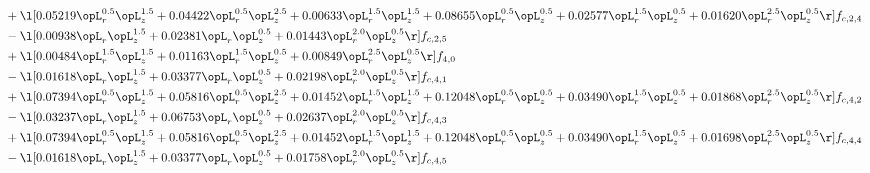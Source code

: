 \begin{alignat}{2}
& + \l[  0.05219 \opL_r^{0.5} \opL_z^{1.5} +  0.04422 \opL_r^{0.5} \opL_z^{2.5} +  0.00633 \opL_r^{1.5} \opL_z^{1.5} +  0.08655 \opL_r^{0.5} \opL_z^{0.5} +  0.02577 \opL_r^{1.5} \opL_z^{0.5} +  0.01620 \opL_r^{2.5} \opL_z^{0.5}  \r] f_{c,2,4} \nonumber \\ 
& - \l[  0.00938 \opL_r \opL_z^{1.5} +  0.02381 \opL_r \opL_z^{0.5} +  0.01443 \opL_r^{2.0} \opL_z^{0.5}  \r] f_{c,2,5} \nonumber \\ 
& + \l[  0.00484 \opL_r^{1.5} \opL_z^{1.5} +  0.01163 \opL_r^{1.5} \opL_z^{0.5} +  0.00849 \opL_r^{2.5} \opL_z^{0.5}  \r] f_{4,0} \nonumber \\ 
& - \l[  0.01618 \opL_r \opL_z^{1.5} +  0.03377 \opL_r \opL_z^{0.5} +  0.02198 \opL_r^{2.0} \opL_z^{0.5}  \r] f_{c,4,1} \nonumber \\ 
& + \l[  0.07394 \opL_r^{0.5} \opL_z^{1.5} +  0.05816 \opL_r^{0.5} \opL_z^{2.5} +  0.01452 \opL_r^{1.5} \opL_z^{1.5} +  0.12048 \opL_r^{0.5} \opL_z^{0.5} +  0.03490 \opL_r^{1.5} \opL_z^{0.5} +  0.01868 \opL_r^{2.5} \opL_z^{0.5}  \r] f_{c,4,2} \nonumber \\ 
& - \l[  0.03237 \opL_r \opL_z^{1.5} +  0.06753 \opL_r \opL_z^{0.5} +  0.02637 \opL_r^{2.0} \opL_z^{0.5}  \r] f_{c,4,3} \nonumber \\ 
& + \l[  0.07394 \opL_r^{0.5} \opL_z^{1.5} +  0.05816 \opL_r^{0.5} \opL_z^{2.5} +  0.01452 \opL_r^{1.5} \opL_z^{1.5} +  0.12048 \opL_r^{0.5} \opL_z^{0.5} +  0.03490 \opL_r^{1.5} \opL_z^{0.5} +  0.01698 \opL_r^{2.5} \opL_z^{0.5}  \r] f_{c,4,4} \nonumber \\ 
& - \l[  0.01618 \opL_r \opL_z^{1.5} +  0.03377 \opL_r \opL_z^{0.5} +  0.01758 \opL_r^{2.0} \opL_z^{0.5}  \r] f_{c,4,5} \nonumber \\ 
\end{alignat} 


